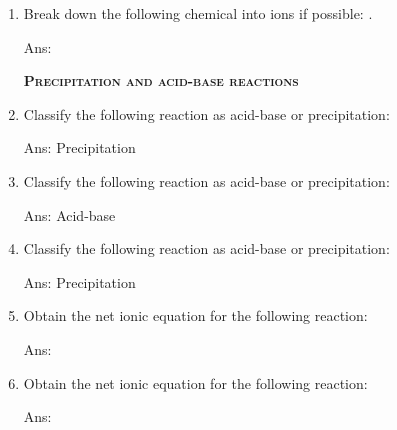 \documentclass[main.tex]{subfiles}
\begin{document}
\begin{multicols*}{2}
\begin{enumerate}
\item Break down the following chemical into ions if possible: .
\begin{flushright}\small Ans: \end{flushright}

{\raggedright\textsc{\textbf{Precipitation and acid-base reactions}}\par}

\item Classify the following reaction as acid-base or precipitation:
\begin{center}\end{center}
\begin{flushright}\small Ans:  Precipitation \end{flushright}

\item Classify the following reaction as acid-base or precipitation:
\begin{center}\end{center}
\begin{flushright}\small Ans:  Acid-base \end{flushright}

\item Classify the following reaction as acid-base or precipitation:
\begin{center}\end{center}
\begin{flushright}\small Ans:  Precipitation \end{flushright}


\item Obtain the net ionic equation for the following reaction:
\begin{center}\end{center}
\begin{flushright}\small Ans:   \end{flushright}

\item Obtain the net ionic equation for the following reaction:
\begin{center}\end{center}
\begin{flushright}\small Ans:   \end{flushright}


\end{enumerate}
\end{multicols*}
\end{document}
